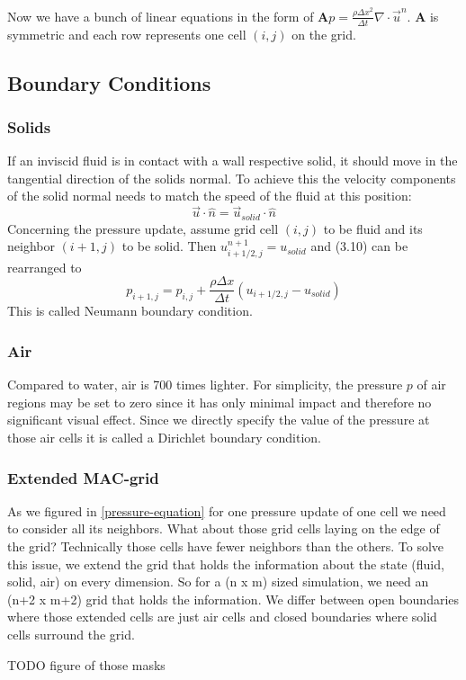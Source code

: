 Now we have a bunch of linear equations in the form of $\mathbf{A}p = \frac{\rho \Delta x^2}{\Delta t}\nabla \cdot \vec{u}^n$. $\mathbf{A}$ is symmetric and each row represents one cell $(i, j)$ on the grid. 


\subsection{Boundary Conditions}
\subsubsection{Solids}
If an inviscid fluid is in contact with a wall respective solid, it should move in the tangential direction of the solids normal. To achieve this the velocity components of the solid normal needs to match the speed of the fluid at this position:
\begin{equation} \label{navier-stokes12}
    \vec{u} \cdot \hat{n} = \vec{u}_{solid} \cdot \hat{n}
\end{equation}
Concerning the pressure update, assume grid cell $(i,j)$ to be fluid and its neighbor $(i+1,j)$ to be solid. Then $u_{i+1/2,j}^{n+1} = u_{solid}$ and (3.10) can be rearranged to 
\begin{equation} \label{navier-stokes12}
    p_{i+1,j} = p_{i,j} + \frac{\rho \Delta x}{\Delta t} (u_{i+1/2,j} - u_{solid})
\end{equation}
This is called Neumann boundary condition.

\subsubsection{Air}
Compared to water, air is 700 times lighter. For simplicity, the pressure $p$ of air regions may be set to zero since it has only minimal impact and therefore no significant visual effect. Since we directly specify the value of the pressure at those air cells it is called a Dirichlet boundary condition.


\subsubsection{Extended MAC-grid}
As we figured in \ref{pressure-equation} for one pressure update of one cell we need to consider all its neighbors. What about those grid cells laying on the edge of the grid? Technically those cells have fewer neighbors than the others. To solve this issue, we extend the grid that holds the information about the state (fluid, solid, air) on every dimension. So for a (n x m) sized simulation, we need an (n+2 x m+2) grid that holds the information. We differ between open boundaries where those extended cells are just air cells and closed boundaries where solid cells surround the grid.
\par TODO figure of those masks

